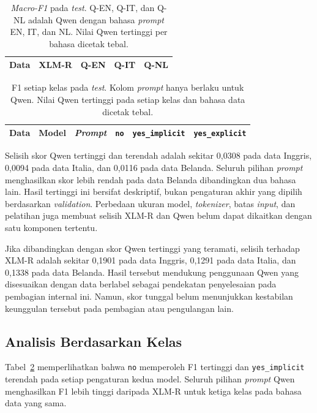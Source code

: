 \documentclass[11pt]{article}
\begin{document}
\begin{table}[t]
\centering\small
\setlength{\tabcolsep}{2pt}
\begin{tabular}{lrrrr}
\toprule
Data & XLM-R & Q-EN & Q-IT & Q-NL \\
\midrule

\end{tabular}
\caption{\textit{Macro-F1} pada \textit{test}. Q-EN, Q-IT, dan Q-NL adalah Qwen dengan bahasa \textit{prompt} EN, IT, dan NL. Nilai Qwen tertinggi per bahasa dicetak tebal.}
\label{tab:main}
\end{table}

\begin{table}[t]
\centering\small
\begin{tabular}{lllrrr}
\toprule
Data & Model & \textit{Prompt} & \texttt{no} & \texttt{yes\_implicit} & \texttt{yes\_explicit} \\
\midrule

\end{tabular}
\caption{F1 setiap kelas pada \textit{test}. Kolom \textit{prompt} hanya berlaku untuk Qwen. Nilai Qwen tertinggi pada setiap kelas dan bahasa data dicetak tebal.}
\label{tab:classes}
\end{table}

Selisih skor Qwen tertinggi dan terendah adalah sekitar 0,0308 pada data Inggris, 0,0094 pada data Italia, dan 0,0116 pada data Belanda. Seluruh pilihan \textit{prompt} menghasilkan skor lebih rendah pada data Belanda dibandingkan dua bahasa lain. Hasil tertinggi ini bersifat deskriptif, bukan pengaturan akhir yang dipilih berdasarkan \textit{validation}. Perbedaan ukuran model, \textit{tokenizer}, batas \textit{input}, dan pelatihan juga membuat selisih XLM-R dan Qwen belum dapat dikaitkan dengan satu komponen tertentu.

Jika dibandingkan dengan skor Qwen tertinggi yang teramati, selisih terhadap XLM-R adalah sekitar 0,1901 pada data Inggris, 0,1291 pada data Italia, dan 0,1338 pada data Belanda. Hasil tersebut mendukung penggunaan Qwen yang disesuaikan dengan data berlabel sebagai pendekatan penyelesaian pada pembagian internal ini. Namun, skor tunggal belum menunjukkan kestabilan keunggulan tersebut pada pembagian atau pengulangan lain.

\subsection{Analisis Berdasarkan Kelas}
Tabel~\ref{tab:classes} memperlihatkan bahwa \texttt{no} memperoleh F1 tertinggi dan \texttt{yes\_implicit} terendah pada setiap pengaturan kedua model. Seluruh pilihan \textit{prompt} Qwen menghasilkan F1 lebih tinggi daripada XLM-R untuk ketiga kelas pada bahasa data yang sama.
\end{document}
